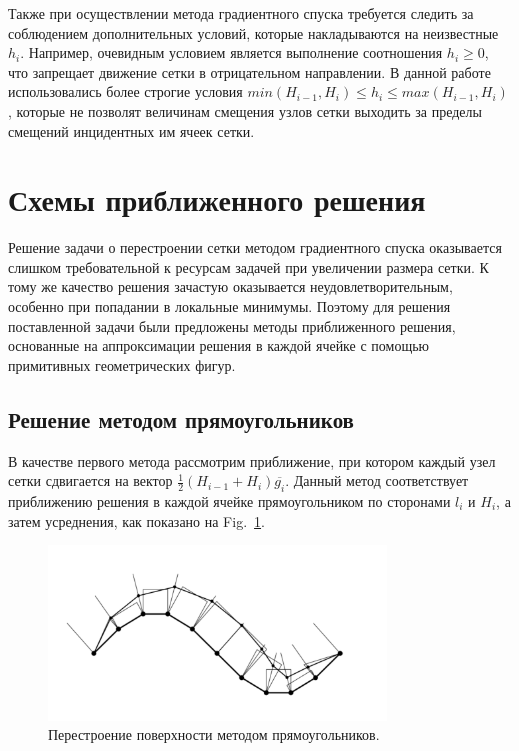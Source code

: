 \documentclass[
11pt,%
tightenlines,%
twoside,%
onecolumn,%
nofloats,%
nobibnotes,%
nofootinbib,%
superscriptaddress,%
noshowpacs,%
centertags]%
{revtex4}
\begin{document}
Также при осуществлении метода градиентного спуска требуется следить за соблюдением дополнительных условий, которые накладываются на неизвестные $h_i$.
Например, очевидным условием является выполнение соотношения $h_i \ge 0$, что запрещает движение сетки в отрицательном направлении.
В данной работе использовались более строгие условия $min(H_{i - 1}, H_i) \le h_i \le max(H_{i - 1}, H_i)$, которые не позволят величинам смещения узлов сетки выходить за пределы смещений инцидентных им ячеек сетки.

\section{Схемы приближенного решения}

Решение задачи о перестроении сетки методом градиентного спуска оказывается слишком требовательной к ресурсам задачей при увеличении размера сетки.
К тому же качество решения зачастую оказывается неудовлетворительным, особенно при попадании в локальные минимумы.
Поэтому для решения поставленной задачи были предложены методы приближенного решения, основанные на аппроксимации решения в каждой ячейке с помощью примитивных геометрических фигур.

\subsection{Решение методом прямоугольников}

В качестве первого метода рассмотрим приближение, при котором каждый узел сетки сдвигается на вектор $\frac{1}{2}(H_{i - 1} + H_i)\overline{g_i}$.
Данный метод соответствует приближению решения в каждой ячейке прямоугольником по сторонами $l_i$ и $H_i$, а затем усреднения, как показано на Fig.~\ref{fig:grid_rectangles}.

\begin{figure}[h]
\setcaptionmargin{5mm}
\onelinecaptionstrue
\includegraphics[width=0.8\textwidth]{pics/grid_rectangles.pdf}
\caption{Перестроение поверхности методом прямоугольников.}
\label{fig:grid_rectangles}
\end{figure}
\end{document}
